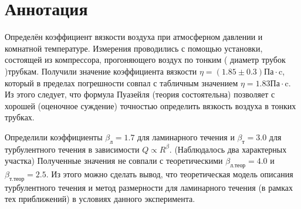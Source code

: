 \section*{Аннотация}
Определён коэффициент вязкости воздуха при атмосферном давлении и комнатной температуре. Измерения проводились с помощью установки, состоящей из компрессора, прогоняющего воздух по тонким ( диаметр трубок )трубкам. Получили значение коэффициента вязкости $\eta = (1.85\pm0.3)\text{Па}\cdot\text{c}$, который в пределах погрешности совпал с табличным значением $\eta = 1.83 \text{Па}\cdot\text{c}$. Из этого следует, что формула Пуазейля (теория состоятельна) позволяет с хорошей (оценочное суждение) точностью определить вязкость воздуха в тонких трубках.

Определили коэффициенты $\beta_\text{л} = 1.7$ для ламинарного течения и $\beta_\text{т} = 3.0$ для турбулентного течения в зависимости $Q \propto R^\beta$. (Наблюдалось два характерных участка) Полученные значения не совпали с теоретическими $\beta_\text{л.теор} = 4.0$ и $\beta_\text{т.теор} = 2.5$. Из этого можно сделать вывод, что теоретическая модель описания турбулентного течения и метод размерности для ламинарного течения (в рамках тех приближений) в условиях данного эксперимента.
